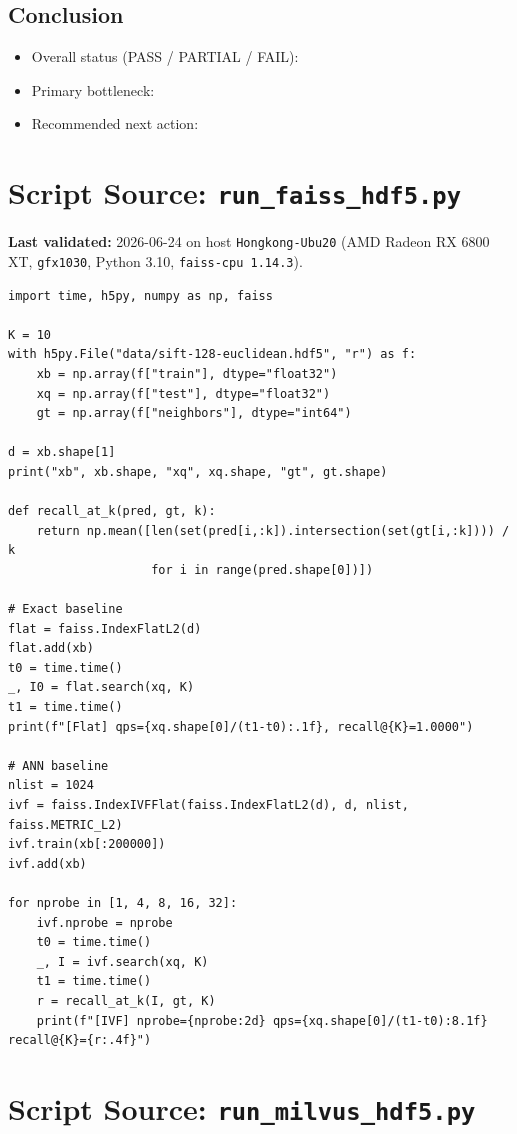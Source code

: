 \documentclass[11pt,a4paper]{article}
\begin{document}
\subsection*{Conclusion}
\begin{itemize}[leftmargin=*]
  \item Overall status (PASS / PARTIAL / FAIL):
  \item Primary bottleneck:
  \item Recommended next action:
\end{itemize}

\section{Script Source: \texttt{run\_faiss\_hdf5.py}}
\label{app:script-faiss}

\noindent\textbf{Last validated:} 2026-06-24 on host \texttt{Hongkong-Ubu20}
(AMD Radeon RX 6800 XT, \texttt{gfx1030}, Python 3.10, \texttt{faiss-cpu 1.14.3}).

\begin{verbatim}
import time, h5py, numpy as np, faiss

K = 10
with h5py.File("data/sift-128-euclidean.hdf5", "r") as f:
    xb = np.array(f["train"], dtype="float32")
    xq = np.array(f["test"], dtype="float32")
    gt = np.array(f["neighbors"], dtype="int64")

d = xb.shape[1]
print("xb", xb.shape, "xq", xq.shape, "gt", gt.shape)

def recall_at_k(pred, gt, k):
    return np.mean([len(set(pred[i,:k]).intersection(set(gt[i,:k]))) / k
                    for i in range(pred.shape[0])])

# Exact baseline
flat = faiss.IndexFlatL2(d)
flat.add(xb)
t0 = time.time()
_, I0 = flat.search(xq, K)
t1 = time.time()
print(f"[Flat] qps={xq.shape[0]/(t1-t0):.1f}, recall@{K}=1.0000")

# ANN baseline
nlist = 1024
ivf = faiss.IndexIVFFlat(faiss.IndexFlatL2(d), d, nlist, faiss.METRIC_L2)
ivf.train(xb[:200000])
ivf.add(xb)

for nprobe in [1, 4, 8, 16, 32]:
    ivf.nprobe = nprobe
    t0 = time.time()
    _, I = ivf.search(xq, K)
    t1 = time.time()
    r = recall_at_k(I, gt, K)
    print(f"[IVF] nprobe={nprobe:2d} qps={xq.shape[0]/(t1-t0):8.1f} recall@{K}={r:.4f}")
\end{verbatim}

\section{Script Source: \texttt{run\_milvus\_hdf5.py}}
\label{app:script-milvus}
\end{document}
